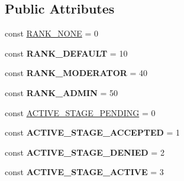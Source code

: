 \subsection*{Public Attributes}
\begin{DoxyCompactItemize}
\item 
const \hyperlink{classUser_ad4d2977f50b53b871bf059c570faf6d3}{RANK\_\-NONE} = 0
\item 
\hypertarget{classUser_abf235e3266be93f7b6fa230429e15ba6}{
const {\bfseries RANK\_\-DEFAULT} = 10}
\label{classUser_abf235e3266be93f7b6fa230429e15ba6}

\item 
\hypertarget{classUser_a8d3d400b5cb4c933963255e8799f39e1}{
const {\bfseries RANK\_\-MODERATOR} = 40}
\label{classUser_a8d3d400b5cb4c933963255e8799f39e1}

\item 
\hypertarget{classUser_ab96faeea11f461f03030b2f1b176d3a0}{
const {\bfseries RANK\_\-ADMIN} = 50}
\label{classUser_ab96faeea11f461f03030b2f1b176d3a0}

\item 
const \hyperlink{classUser_ad477706601fcfa5e9c58a52c626eac9c}{ACTIVE\_\-STAGE\_\-PENDING} = 0
\item 
\hypertarget{classUser_af5fe8fb1e16561835ff7416e33d37111}{
const {\bfseries ACTIVE\_\-STAGE\_\-ACCEPTED} = 1}
\label{classUser_af5fe8fb1e16561835ff7416e33d37111}

\item 
\hypertarget{classUser_aebed8e4f1739aa721934983a0df6f72c}{
const {\bfseries ACTIVE\_\-STAGE\_\-DENIED} = 2}
\label{classUser_aebed8e4f1739aa721934983a0df6f72c}

\item 
\hypertarget{classUser_ae79915e6168bc538edd804be9ab9f4a8}{
const {\bfseries ACTIVE\_\-STAGE\_\-ACTIVE} = 3}
\label{classUser_ae79915e6168bc538edd804be9ab9f4a8}

\end{DoxyCompactItemize}
